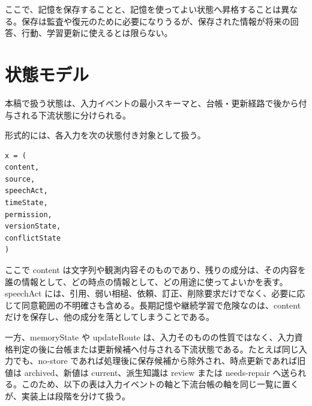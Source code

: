 \documentclass[12pt,a4paper]{article}
\begin{document}
ここで、記憶を保存することと、記憶を使ってよい状態へ昇格することは異なる。保存は監査や復元のために必要になりうるが、保存された情報が将来の回答、行動、学習更新に使えるとは限らない。

\section{状態モデル}\label{ux72b6ux614bux30e2ux30c7ux30eb}

本稿で扱う状態は、入力イベントの最小スキーマと、台帳・更新経路で後から付与される下流状態に分けられる。

形式的には、各入力を次の状態付き対象として扱う。

\begin{verbatim}
x = (
content,
source,
speechAct,
timeState,
permission,
versionState,
conflictState
)
\end{verbatim}

ここで content は文字列や観測内容そのものであり、残りの成分は、その内容を誰の情報として、どの時点の情報として、どの用途に使ってよいかを表す。speechAct には、引用、弱い相槌、依頼、訂正、削除要求だけでなく、必要に応じて同意範囲の不明確さも含める。長期記憶や継続学習で危険なのは、content だけを保存し、他の成分を落としてしまうことである。

一方、memoryState や updateRoute は、入力そのものの性質ではなく、入力資格判定の後に台帳または更新候補へ付与される下流状態である。たとえば同じ入力でも、no-store であれば処理後に保存候補から除外され、時点更新であれば旧値は archived、新値は current、派生知識は review または needs-repair へ送られる。このため、以下の表は入力イベントの軸と下流台帳の軸を同じ一覧に置くが、実装上は段階を分けて扱う。
\end{document}
